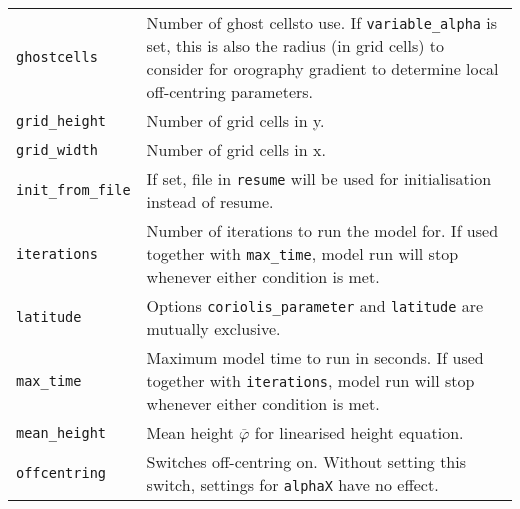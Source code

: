 \documentclass[11pt,a4paper,openright,twoside]{book}
\begin{document}
\newpage
\begin{tabular}{p{45mm}p{75mm}}
  \texttt{ghostcells} & Number of ghost cells\footnotemark[2] to use. If \texttt{variable\_alpha} is set, this is also the radius (in grid cells) to consider for orography gradient to determine local off-centring parameters.\\
  \texttt{grid\_height} & Number of grid cells in y.\\
  \texttt{grid\_width} & Number of grid cells in x.\\
  \texttt{init\_from\_file} & If set, file in \texttt{resume} will be used for initialisation instead of resume.\\
  \texttt{iterations} & Number of iterations to run the model for. If used together with \texttt{max\_time}, model run will stop whenever either condition is met.\\
  \texttt{latitude} &  Options \texttt{coriolis\_parameter} and \texttt{latitude} are mutually exclusive.\\
  \texttt{max\_time} & Maximum model time to run in seconds. If used together with \texttt{iterations}, model run will stop whenever either condition is met.\\
  \texttt{mean\_height} & Mean height $\overline{\varphi}$ for linearised height equation.\\
  \texttt{offcentring} & Switches off-centring on. Without setting this switch, settings for \texttt{alphaX} have no effect.
\end{tabular}
\newpage
\end{document}
